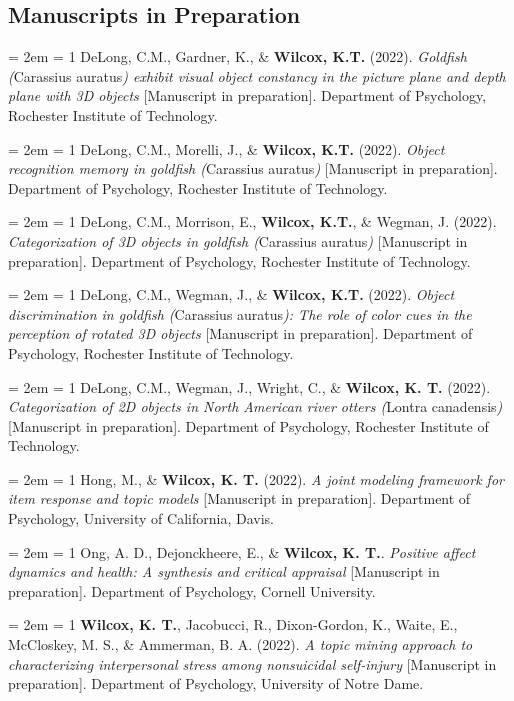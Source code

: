 \documentclass[
  12 pt,
]{article}
\begin{document}
\hypertarget{manuscripts-in-preparation}{%
\subsection{Manuscripts in
Preparation}\label{manuscripts-in-preparation}}

\hangindent = 2em \hangafter = 1 DeLong, C.M., Gardner, K., \&
\textbf{Wilcox, K.T.} (2022). \emph{Goldfish (}Carassius auratus\emph{)
exhibit visual object constancy in the picture plane and depth plane
with 3D objects} {[}Manuscript in preparation{]}. Department of
Psychology, Rochester Institute of Technology.

\hangindent = 2em \hangafter = 1 DeLong, C.M., Morelli, J., \&
\textbf{Wilcox, K.T.} (2022). \emph{Object recognition memory in
goldfish (}Carassius auratus\emph{)} {[}Manuscript in preparation{]}.
Department of Psychology, Rochester Institute of Technology.

\hangindent = 2em \hangafter = 1 DeLong, C.M., Morrison, E.,
\textbf{Wilcox, K.T.}, \& Wegman, J. (2022). \emph{Categorization of 3D
objects in goldfish (}Carassius auratus\emph{)} {[}Manuscript in
preparation{]}. Department of Psychology, Rochester Institute of
Technology.

\hangindent = 2em \hangafter = 1 DeLong, C.M., Wegman, J., \&
\textbf{Wilcox, K.T.} (2022). \emph{Object discrimination in goldfish
(}Carassius auratus\emph{): The role of color cues in the perception of
rotated 3D objects} {[}Manuscript in preparation{]}. Department of
Psychology, Rochester Institute of Technology.

\hangindent = 2em \hangafter = 1 DeLong, C.M., Wegman, J., Wright, C.,
\& \textbf{Wilcox, K. T.} (2022). \emph{Categorization of 2D objects in
North American river otters (}Lontra canadensis\emph{)} {[}Manuscript in
preparation{]}. Department of Psychology, Rochester Institute of
Technology.

\hangindent = 2em \hangafter = 1 Hong, M., \& \textbf{Wilcox, K. T.}
(2022). \emph{A joint modeling framework for item response and topic
models} {[}Manuscript in preparation{]}. Department of Psychology,
University of California, Davis.

\hangindent = 2em \hangafter = 1 Ong, A. D., Dejonckheere, E., \&
\textbf{Wilcox, K. T.}. \emph{Positive affect dynamics and health: A
synthesis and critical appraisal} {[}Manuscript in preparation{]}.
Department of Psychology, Cornell University.

\hangindent = 2em \hangafter = 1 \textbf{Wilcox, K. T.}, Jacobucci, R.,
Dixon-Gordon, K., Waite, E., McCloskey, M. S., \& Ammerman, B. A.
(2022). \emph{A topic mining approach to characterizing interpersonal
stress among nonsuicidal self-injury} {[}Manuscript in preparation{]}.
Department of Psychology, University of Notre Dame.
\end{document}
